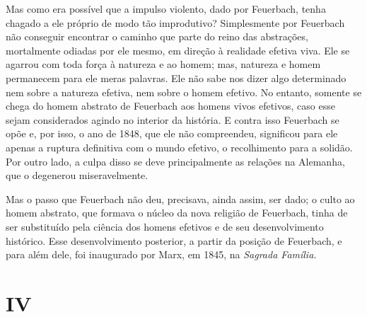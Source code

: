 Mas como era possível que a impulso violento, dado
por Feuerbach, tenha
chagado a ele próprio de modo tão improdutivo? Simplesmente por
Feuerbach não
conseguir encontrar o caminho que parte do reino das abstrações,
mortalmente odiadas por ele mesmo, em direção à realidade efetiva viva.
Ele se agarrou com toda força à natureza e ao homem; mas, natureza e
homem permanecem para ele meras palavras. Ele não sabe nos dizer algo
determinado nem sobre a natureza efetiva, nem sobre o homem efetivo. No
entanto, somente se chega do homem abstrato
de Feuerbach aos
homens vivos efetivos, caso esse sejam considerados agindo no interior
da história. E contra isso
Feuerbach se
opõe e, por isso, o ano de 1848, que ele não compreendeu, significou
para ele apenas a ruptura definitiva com o mundo efetivo, o recolhimento
para a solidão. Por outro lado, a culpa disso se deve principalmente as
relações na Alemanha, que o degenerou miseravelmente.

Mas o passo
que Feuerbach não
deu, precisava, ainda assim, ser dado; o culto ao homem abstrato, que
formava o núcleo da nova religião
de Feuerbach,
tinha de ser substituído pela ciência dos homens efetivos e de seu
desenvolvimento histórico. Esse desenvolvimento posterior, a partir da
posição
de Feuerbach, e para além dele, foi inaugurado por Marx, em 1845, na \emph{Sagrada
Família.}

\quebra

\mbox{}
\vspace{2cm}

\section{IV}

